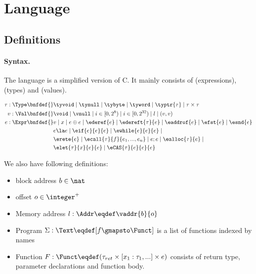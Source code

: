 \section{Language}
\label{sec:language}

\subsection{Definitions}

\paragraph{Syntax.}\label{p:type}

The language is a simplified version of C. It mainly consists of
\Expr{} (expressions), \Type{} (types) and \Val{} (values).

\begin{align*}
    \tau : \Type \bnfdef{}&
        \tyvoid \mid
        \tynull \mid
        \tybyte \mid
        \tyword \mid
        \typtr{\tau} \mid
        \tau \times \tau
\\
    v : \Val \bnfdef{}&
        \void \mid
        \vnull \mid
        i \in [0, 2^8) \mid
        i \in [0, 2^{32}) \mid
        l \mid
        (v, v)
\\
    e : \Expr \bnfdef{}&
       v \mid
       x \mid
       e \oplus e \mid
       \ederef{e} \mid
       \edereft{\tau}{e} \mid
       \eaddrof{e} \mid
       \efst{e} \mid
       \esnd{e}
       \\&
       e \la e \mid
       \eif{e}{e}{e} \mid
       \ewhile{e}{e}{e} \mid
       \\&
       \erete{e} \mid
       \ecall{\tau}{f}{e_1, ..., e_n} \mid
       e ; e \mid
       \ealloc{\tau}{e} \mid
       \\&
       \elet{\tau}{x}{e}{e} \mid
       \eCAS{\tau}{e}{e}{e}
\\
\end{align*}

We also have following definitions:

\begin{itemize}
  \item block address $b \in \nat$
  \item offset $o \in \integer^{+}$
  \item Memory address $l: \Addr \eqdef \vaddr{b}{o}$
  \item Program $\Sigma: \Text \eqdef [f \gmapsto \Funct]$ is a list of functions indexed by names
  \item Function $F: \Funct \eqdef (\tau_{ret} \times [x_1 : \tau_1, ...] \times e)$ consists of return type,
    parameter declarations and function body.
\end{itemize}

